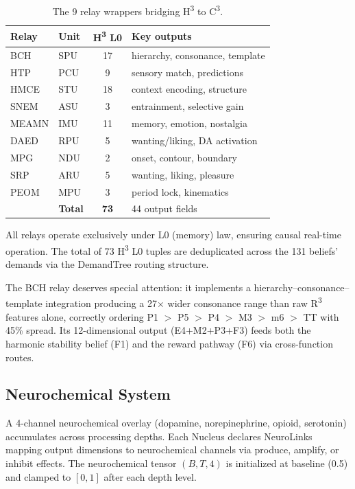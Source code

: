 \documentclass[10pt,twocolumn]{article}
\newcommand{\Rcube}{R\textsuperscript{3}}
\newcommand{\Hcube}{H\textsuperscript{3}}
\newcommand{\Ccube}{C\textsuperscript{3}}
\begin{document}
\begin{table}[!t]
\centering
\caption{The 9 relay wrappers bridging \Hcube{} to \Ccube{}.}
\label{tab:relays}
\small
\begin{tabular}{@{}llcl@{}}
\toprule
\textbf{Relay} & \textbf{Unit} & \textbf{\Hcube{} L0} & \textbf{Key outputs} \\
\midrule
BCH   & SPU & 17 & hierarchy, consonance, template \\
HTP   & PCU &  9 & sensory match, predictions \\
HMCE  & STU & 18 & context encoding, structure \\
SNEM  & ASU &  3 & entrainment, selective gain \\
MEAMN & IMU & 11 & memory, emotion, nostalgia \\
DAED  & RPU &  5 & wanting/liking, DA activation \\
MPG   & NDU &  2 & onset, contour, boundary \\
SRP   & ARU &  5 & wanting, liking, pleasure \\
PEOM  & MPU &  3 & period lock, kinematics \\
\midrule
      & \textbf{Total} & \textbf{73} & 44 output fields \\
\bottomrule
\end{tabular}
\end{table}

All relays operate exclusively under L0 (memory) law, ensuring causal real-time operation.
The total of 73 \Hcube{} L0 tuples are deduplicated across the 131 beliefs' demands via the DemandTree routing structure.

The BCH relay deserves special attention: it implements a hierarchy--consonance--template integration producing a 27$\times$ wider consonance range than raw \Rcube{} features alone, correctly ordering P1 $>$ P5 $>$ P4 $>$ M3 $>$ m6 $>$ TT with 45\% spread.
Its 12-dimensional output (E4+M2+P3+F3) feeds both the harmonic stability belief (F1) and the reward pathway (F6) via cross-function routes.

\subsection{Neurochemical System}

A 4-channel neurochemical overlay (dopamine, norepinephrine, opioid, serotonin) accumulates across processing depths.
Each Nucleus declares NeuroLinks mapping output dimensions to neurochemical channels via produce, amplify, or inhibit effects.
The neurochemical tensor $(B, T, 4)$ is initialized at baseline (0.5) and clamped to $[0, 1]$ after each depth level.
\end{document}
